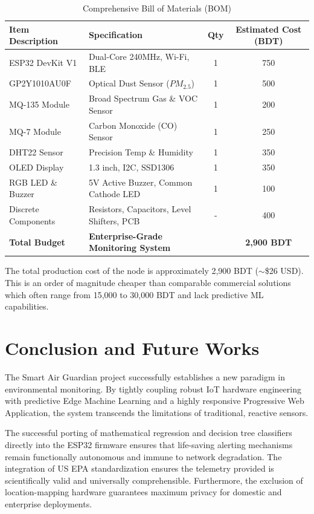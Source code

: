 \documentclass[12pt,journal,onecolumn,a4paper]{IEEEtran}
\begin{document}
\begin{table}[htbp]
\centering
\caption{Comprehensive Bill of Materials (BOM)}
\begin{tabularx}{\textwidth}{@{} l X c c @{}}
\toprule
\textbf{Item Description} & \textbf{Specification} & \textbf{Qty} & \textbf{Estimated Cost (BDT)} \\ \midrule
ESP32 DevKit V1 & Dual-Core 240MHz, Wi-Fi, BLE & 1 & 750 \\
GP2Y1010AU0F & Optical Dust Sensor ($PM_{2.5}$) & 1 & 500 \\
MQ-135 Module & Broad Spectrum Gas \& VOC Sensor & 1 & 200 \\
MQ-7 Module & Carbon Monoxide (CO) Sensor & 1 & 250 \\
DHT22 Sensor & Precision Temp \& Humidity & 1 & 350 \\
OLED Display & 1.3 inch, I2C, SSD1306 & 1 & 350 \\
RGB LED \& Buzzer & 5V Active Buzzer, Common Cathode LED & 1 & 100 \\
Discrete Components & Resistors, Capacitors, Level Shifters, PCB & - & 400 \\ \midrule
\textbf{Total Budget} & \textbf{Enterprise-Grade Monitoring System} & & \textbf{2,900 BDT} \\ \bottomrule
\end{tabularx}
\end{table}

The total production cost of the node is approximately 2,900 BDT ($\sim$\$26 USD). This is an order of magnitude cheaper than comparable commercial solutions which often range from 15,000 to 30,000 BDT and lack predictive ML capabilities.

\section{Conclusion and Future Works}
The Smart Air Guardian project successfully establishes a new paradigm in environmental monitoring. By tightly coupling robust IoT hardware engineering with predictive Edge Machine Learning and a highly responsive Progressive Web Application, the system transcends the limitations of traditional, reactive sensors. 

The successful porting of mathematical regression and decision tree classifiers directly into the ESP32 firmware ensures that life-saving alerting mechanisms remain functionally autonomous and immune to network degradation. The integration of US EPA standardization ensures the telemetry provided is scientifically valid and universally comprehensible. Furthermore, the exclusion of location-mapping hardware guarantees maximum privacy for domestic and enterprise deployments.
\end{document}
